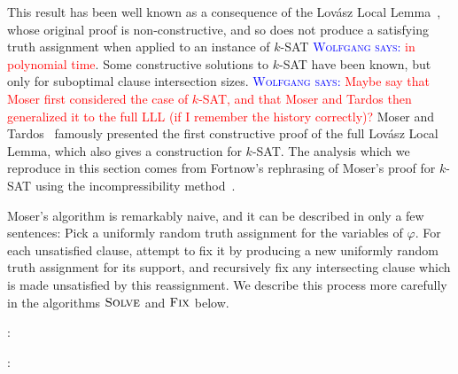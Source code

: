 \documentclass{patmorin}
\newcommand{\aremark}[3]{\textcolor{blue}{\textsc{#1 #2:}}
  \textcolor{red}{\textsf{#3}}}
\newcommand{\wolfgang}[2][says]{\aremark{Wolfgang}{#1}{#2}}
\begin{document}
This result has been well known as a consequence of the Lov\'{a}sz
Local Lemma~\cite{lovasz:locallemma}, whose original proof is
non-constructive, and so does not produce a satisfying truth
assignment when applied to an instance of $k$-SAT \wolfgang{in
polynomial time}. Some constructive
solutions to $k$-SAT have been known, but only for suboptimal clause
intersection sizes. 
\wolfgang{Maybe say that Moser first considered the case
 of $k$-SAT, and that Moser and Tardos then generalized it to
 the full LLL (if I remember the history correctly)?}
Moser and Tardos~\cite{moser:locallemma} famously
presented the first constructive proof of the full Lov\'{a}sz Local
Lemma, which also gives a construction for $k$-SAT. The analysis which
we reproduce in this section comes from Fortnow's rephrasing of
Moser's proof for $k$-SAT using the incompressibility
method~\cite{fortnow:ksat}.

Moser's algorithm is remarkably naive, and it can be described in only a
few sentences: Pick a uniformly random truth assignment for the
variables of $\varphi$. For each unsatisfied clause, attempt to fix it
by producing a new uniformly random truth assignment for its support,
and recursively fix any intersecting clause which is made unsatisfied
by this reassignment. We describe this process more carefully in the
algorithms $\textsc{Solve}$ and $\textsc{Fix}$ below.

:
\begin{algorithmic}[1]
  \ENDWHILE
  \RETURN{$\alpha$}
\end{algorithmic}

:
\begin{algorithmic}[1]
  \ENDWHILE
  \RETURN{$\alpha$}
\end{algorithmic}
\end{document}

